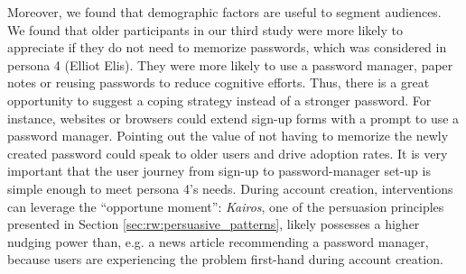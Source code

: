 Moreover, we found that demographic factors are useful to segment audiences. We found that older participants in our third study were more likely to appreciate if they do not need to memorize passwords, which was considered in persona 4 (Elliot Elis). They were more likely to use a password manager, paper notes or reusing passwords to reduce cognitive efforts. Thus, there is a great opportunity to suggest a coping strategy instead of a stronger password. For instance, websites or browsers could extend sign-up forms with a prompt to use a password manager. Pointing out the value of not having to memorize the newly created password could speak to older users and drive adoption rates. It is very important that the user journey from sign-up to password-manager set-up is simple enough to meet persona 4's needs. During account creation, interventions can leverage the ``opportune moment'': \textit{Kairos}, one of the persuasion principles presented in Section \ref{sec:rw:persuasive_patterns}, likely possesses a higher nudging power than, e.g. a news article recommending a password manager, because users are experiencing the problem first-hand during account creation. 




